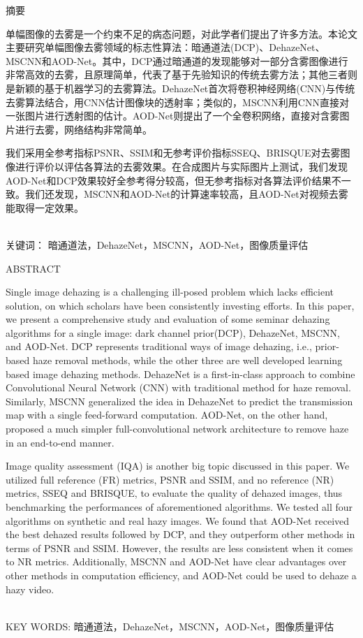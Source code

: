 \documentclass[a4paper, 12pt, oneside]{report}
\renewenvironment{abstract}[1]
{
\newcommand{\keywords}{#1}
\phantomsection
\addcontentsline{toc}{chapter}{摘要\quad }

\begin{center}
\fontsize{18}{21.6}\selectfont 摘\qquad 要
\end{center}
}
{
  \\[1\baselineskip]
  关键词： \keywords
}
\newenvironment{englishabstract}[1]
{
\newcommand{\keywords}{#1}
\phantomsection
\addcontentsline{toc}{chapter}{Abstract\quad }

\begin{center}
ABSTRACT
\end{center}
}
{
\\[1\baselineskip]
KEY WORDS: \keywords
}
\begin{document}
\begin{abstract}{暗通道法，DehazeNet，MSCNN，AOD-Net，图像质量评估}
\linespread{1.3}

单幅图像的去雾是一个约束不足的病态问题，对此学者们提出了许多方法。本论文主要研究单幅图像去雾领域的标志性算法：暗通道法(DCP)、DehazeNet、MSCNN和AOD-Net。其中，DCP通过暗通道的发现能够对一部分含雾图像进行非常高效的去雾，且原理简单，代表了基于先验知识的传统去雾方法；其他三者则是新颖的基于机器学习的去雾算法。DehazeNet首次将卷积神经网络(CNN)与传统去雾算法结合，用CNN估计图像块的透射率；类似的，MSCNN利用CNN直接对一张图片进行透射图的估计。AOD-Net则提出了一个全卷积网络，直接对含雾图片进行去雾，网络结构非常简单。

我们采用全参考指标PSNR、SSIM和无参考评价指标SSEQ、BRISQUE对去雾图像进行评价以评估各算法的去雾效果。在合成图片与实际图片上测试，我们发现AOD-Net和DCP效果较好全参考得分较高，但无参考指标对各算法评价结果不一致。我们还发现，MSCNN和AOD-Net的计算速率较高，且AOD-Net对视频去雾能取得一定效果。
\end{abstract}
\newpage

\begin{englishabstract}{dark channel prior, DehazeNet, MSCNN, AOD-Net, image quality assessment}
\par Single image dehazing is a challenging ill-posed problem which lacks efficient solution, on which scholars have been consistently investing efforts. In this paper, we present a comprehensive study and evaluation of some seminar dehazing algorithms for a single image: dark channel prior(DCP), DehazeNet, MSCNN, and AOD-Net. DCP represents traditional ways of image dehazing, i.e., prior-based haze removal methods, while the other three are well developed learning based image dehazing methods. DehazeNet is a first-in-class approach to combine Convolutional Neural Network (CNN) with traditional method for haze removal. Similarly, MSCNN generalized the idea in DehazeNet to predict the transmission map with a single feed-forward computation. AOD-Net, on the other hand, proposed a much simpler full-convolutional network architecture to remove haze in an end-to-end manner.  

Image quality assessment (IQA) is another big topic discussed in this paper. We utilized full reference (FR) metrics, PSNR and SSIM, and no reference (NR) metrics, SSEQ and BRISQUE, to evaluate the quality of dehazed images, thus benchmarking the performances of aforementioned algorithms. We tested all four algorithms on synthetic and real hazy images. We found that AOD-Net received the best dehazed results followed by DCP, and they outperform other methods in terms of PSNR and SSIM. However, the results are less consistent when it comes to NR metrics. Additionally, MSCNN and AOD-Net have clear advantages over other methods in computation efficiency, and AOD-Net could be used to dehaze a hazy video.   
\end{englishabstract}
\newpage
\end{document}
